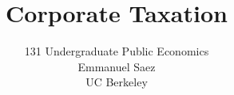 \documentclass[landscape]{slides}
\author{131 Undergraduate Public Economics \\ Emmanuel Saez \\ UC Berkeley}
\date{}
\title{Corporate Taxation} \onlyslides{1-300}
\begin{document}
\begin{slide}
\maketitle
\end{slide}

%
%
%
%
%
%
%
%

%


%
%
\end{document}
